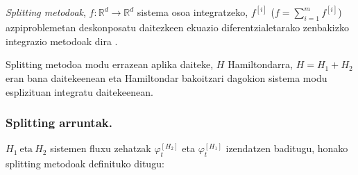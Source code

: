 \emph{Splitting metodoak}, $f: \mathbb{R}^d \rightarrow \mathbb{R}^d$ sistema osoa integratzeko, $f^{[i]}$ ($f=\sum\limits_{i=1}^{m} f^{[i]}$) azpiproblemetan deskonposatu daitezkeen ekuazio diferentzialetarako zenbakizko integrazio metodoak dira \cite{SSerna2015b,Hairer2006}.

Splitting metodoa modu errazean aplika daiteke, $H$ Hamiltondarra, $H=H_1+H_2$ eran bana daitekeenean eta Hamiltondar bakoitzari dagokion sistema modu esplizituan integratu daitekeenean.  

\subsubsection*{Splitting arruntak.}

$H_1 \ \text{eta} \ H_2$ sistemen fluxu zehatzak $\varphi_t^{[H_2]}$ eta $\varphi_t^{[H_1]}$ izendatzen baditugu, honako splitting metodoak definituko ditugu:

